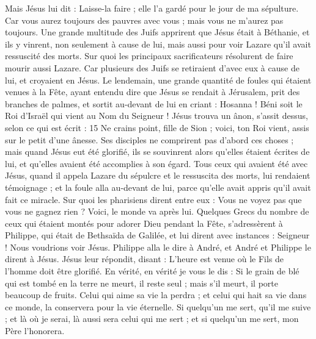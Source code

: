 \begin{multicols}{2}
Mais Jésus lui dit : Laisse-la faire ; elle l'a gardé pour le jour de ma sépulture.
Car vous aurez toujours des pauvres avec vous ; mais vous ne m'aurez pas toujours.
Une grande multitude des Juifs apprirent que Jésus était à Béthanie, et ils y vinrent, non seulement à cause de lui, mais aussi pour voir Lazare qu'il avait ressuscité des morts.
Sur quoi les principaux sacrificateurs résolurent de faire mourir aussi Lazare.
Car plusieurs des Juifs se retiraient d'avec eux à cause de lui, et croyaient en Jésus.
Le lendemain, une grande quantité de foules qui étaient venues à la Fête, ayant entendu dire que Jésus se rendait à Jérusalem,
prit des branches de palmes, et sortit au-devant de lui en criant : Hosanna ! Béni soit le Roi d'Israël qui vient au Nom du Seigneur !
Jésus trouva un ânon, s'assit dessus, selon ce qui est écrit : 15 Ne crains point, fille de Sion ; voici, ton Roi vient, assis sur le petit d'une ânesse.
Ses disciples ne comprirent pas d'abord ces choses ; mais quand Jésus eut été glorifié, ils se souvinrent alors qu'elles étaient écrites de lui, et qu'elles avaient été accomplies à son égard.
Tous ceux qui avaient été avec Jésus, quand il appela Lazare du sépulcre et le ressuscita des morts, lui rendaient témoignage ;
et la foule alla au-devant de lui, parce qu'elle avait appris qu'il avait fait ce miracle.
Sur quoi les pharisiens dirent entre eux : Vous ne voyez pas que vous ne gagnez rien ? Voici, le monde va après lui.
Quelques Grecs du nombre de ceux qui étaient montés pour adorer Dieu pendant la Fête,
s'adressèrent à Philippe, qui était de Bethsaïda de Galilée, et lui dirent avec instances : Seigneur ! Nous voudrions voir Jésus.
Philippe alla le dire à André, et André et Philippe le dirent à Jésus.
Jésus leur répondit, disant : L'heure est venue où le Fils de l'homme doit être glorifié.
En vérité, en vérité je vous le dis : Si le grain de blé qui est tombé en la terre ne meurt, il reste seul ; mais s'il meurt, il porte beaucoup de fruits.
Celui qui aime sa vie la perdra ; et celui qui hait sa vie dans ce monde, la conservera pour la vie éternelle.
Si quelqu'un me sert, qu'il me suive ; et là où je serai, là aussi sera celui qui me sert ; et si quelqu'un me sert, mon Père l'honorera.

\end{multicols}
